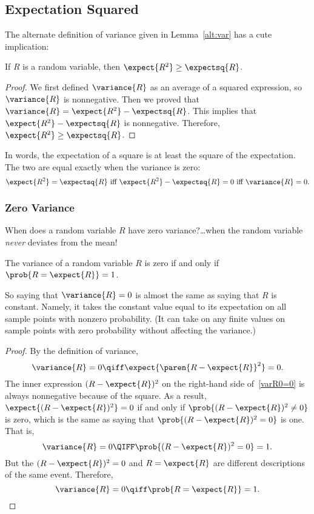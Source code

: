 \begin{editingnotes}
\subsection{Expectation Squared}

The alternate definition of variance given in Lemma~\ref{alt:var} has
a cute implication:
\begin{corollary}
If $R$ is a random variable, then $\expect{R^2} \geq \expectsq{R}$.
\end{corollary}
\begin{proof}
We first defined $\variance{R}$ as an average of a squared expression, so
$\variance{R}$ is nonnegative.  Then we proved that $\variance{R} =
\expect{R^2} - \expectsq{R}$.  This implies that $\expect{R^2} -
\expectsq{R}$ is nonnegative.  Therefore, $\expect{R^2} \geq
\expectsq{R}$.
\end{proof}

In words, the expectation of a square is at least the square of the
expectation. The two are equal exactly when the variance is zero:
\begin{displaymath}
\expect{R^2} = \expectsq{R} \text{  iff  } \expect{R^2} - \expectsq{R} = 0
\text{  iff  } \variance{R} = 0.
\end{displaymath}

\subsubsection*{Zero Variance}

When does a random variable $R$ have zero variance?\dots when the random
variable \emph{never} deviates from the mean!
\begin{lemma*}%
The variance of a random variable $R$ is zero if and only if $\prob{R =
\expect{R}} = 1$.
\end{lemma*}

So saying that $\variance{R}=0$ is almost the same as saying that $R$ is
constant.  Namely, it takes the constant value equal to its expectation on
all sample points with nonzero probability.  (It can take on any finite
values on sample points with zero probability without affecting the
variance.)

\begin{proof}
By the definition of variance,
\begin{equation}\label{varR0=0}
\variance{R} = 0\qiff \expect{\paren{R - \expect{R}}^2} = 0.
\end{equation}
The inner expression $(R - \expect{R})^2$ on the right-hand side of~\eqref{varR0=0} is always
nonnegative because of the square.  As a result, $\expect{(R -
\expect{R})^2} = 0$ if and only if $\prob{(R - \expect{R})^2 \neq 0}$ is
zero, which is the same as saying that $\prob{(R - \expect{R})^2 = 0}$ is
one.  That is,
\[
\variance{R} = 0 \QIFF \prob{(R - \expect{R})^2 = 0} = 1.
\]
But the $(R - \expect{R})^2 = 0$ and $R = \expect{R}$ are different
descriptions of the same event.  Therefore,
\[
\variance{R} = 0 \qiff \prob{R = \expect{R}} =1.
\]
\end{proof}

\end{editingnotes}


